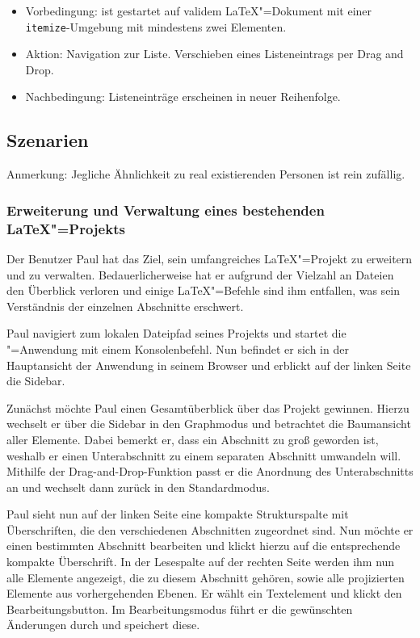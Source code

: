 \begin{itemize}
  \item Vorbedingung: \texla{} ist gestartet auf validem \LaTeX"=Dokument mit einer \verb|itemize|-Umgebung mit
  mindestens zwei Elementen.
  \item Aktion: Navigation zur Liste.
  Verschieben eines Listeneintrags per Drag and Drop.
  \item Nachbedingung: Listeneinträge erscheinen in neuer Reihenfolge.
\end{itemize}

\subsection{Szenarien}
\label{subsec:tests-scenarios}

Anmerkung: Jegliche Ähnlichkeit zu real existierenden Personen ist rein zufällig.

\subsubsection{Erweiterung und Verwaltung eines bestehenden \LaTeX"=Projekts}

Der Benutzer Paul hat das Ziel, sein umfangreiches \LaTeX"=Projekt zu erweitern und zu verwalten.
Bedauerlicherweise hat er aufgrund der Vielzahl an Dateien den Überblick verloren und einige \LaTeX"=Befehle sind
ihm entfallen, was sein Verständnis der einzelnen Abschnitte erschwert.

Paul navigiert zum lokalen Dateipfad seines Projekts und startet die \texla"=Anwendung mit einem Konsolenbefehl.
Nun befindet er sich in der Hauptansicht der Anwendung in seinem Browser und erblickt auf der linken
Seite die Sidebar.

Zunächst möchte Paul einen Gesamtüberblick über das Projekt gewinnen.
Hierzu wechselt er über die Sidebar in den Graphmodus und betrachtet die Baumansicht aller Elemente.
Dabei bemerkt er, dass ein Abschnitt zu groß geworden ist, weshalb er einen Unterabschnitt zu einem separaten Abschnitt
umwandeln will.
Mithilfe der Drag-and-Drop-Funktion passt er die Anordnung des Unterabschnitts an und wechselt dann zurück in den
Standardmodus.

Paul sieht nun auf der linken Seite eine kompakte Strukturspalte
mit Überschriften, die den verschiedenen Abschnitten zugeordnet sind.
Nun möchte er einen bestimmten Abschnitt bearbeiten und klickt hierzu auf die entsprechende kompakte Überschrift.
In der Lesespalte auf der rechten Seite werden ihm nun alle Elemente angezeigt, die zu diesem Abschnitt
gehören, sowie alle projizierten Elemente aus vorhergehenden Ebenen.
Er wählt ein Textelement und klickt den Bearbeitungsbutton.
Im Bearbeitungsmodus führt er die gewünschten Änderungen durch und speichert diese.

